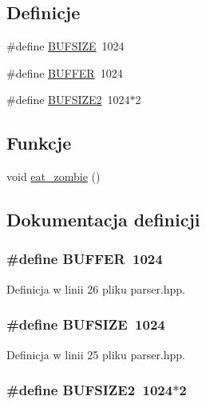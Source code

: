 \subsection*{Definicje}
\begin{CompactItemize}
\item 
\#define \hyperlink{a00015_eca034f67218340ecb2261a22c2f3dcd}{BUFSIZE}~1024
\item 
\#define \hyperlink{a00015_05ec23ea9e68706e210bd8f965beee10}{BUFFER}~1024
\item 
\#define \hyperlink{a00015_b46db07bcc5d1bb3dbc73f7be2592ee0}{BUFSIZE2}~1024$\ast$2
\end{CompactItemize}
\subsection*{Funkcje}
\begin{CompactItemize}
\item 
void \hyperlink{a00015_6c724feff242ad0cd599cdd458f73199}{eat\_\-zombie} ()
\end{CompactItemize}


\subsection{Dokumentacja definicji}
\hypertarget{a00015_05ec23ea9e68706e210bd8f965beee10}{
\subsubsection[{BUFFER}]{\setlength{\rightskip}{0pt plus 5cm}\#define BUFFER~1024}}
\label{dd/d1b/a00015_05ec23ea9e68706e210bd8f965beee10}




Definicja w linii 26 pliku parser.hpp.\hypertarget{a00015_eca034f67218340ecb2261a22c2f3dcd}{
\subsubsection[{BUFSIZE}]{\setlength{\rightskip}{0pt plus 5cm}\#define BUFSIZE~1024}}
\label{dd/d1b/a00015_eca034f67218340ecb2261a22c2f3dcd}




Definicja w linii 25 pliku parser.hpp.\hypertarget{a00015_b46db07bcc5d1bb3dbc73f7be2592ee0}{
\subsubsection[{BUFSIZE2}]{\setlength{\rightskip}{0pt plus 5cm}\#define BUFSIZE2~1024$\ast$2}}
\label{dd/d1b/a00015_b46db07bcc5d1bb3dbc73f7be2592ee0}




